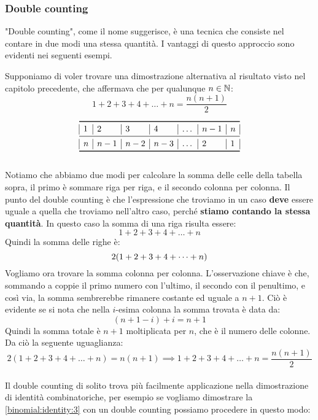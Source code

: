 \documentclass[11pt]{scrartcl}
\begin{document}
	\subsubsection{Double counting}
	"Double counting", come il nome suggerisce, è una tecnica che consiste nel contare in due modi una stessa quantità. I vantaggi di questo approccio sono evidenti nei seguenti esempi.
	
	\begin{example}
		Supponiamo di voler trovare una dimostrazione alternativa al risultato visto nel capitolo precedente, che affermava che per qualunque $n\in\mathbb N$:
		$$1+2+3+4+\dots+n=\frac{n(n+1)}{2}$$
	\end{example}
	\[
	\begin{array}{|l|l|l|l|l|l|l|}
		\toprule
		1 & 2 & 3 & 4 & \dots & n-1 & n\\
		\midrule
		n & n-1 & n-2 & n-3 & \dots & 2 & 1 \\
		\bottomrule
	\end{array}
	\]
	\\
	Notiamo che abbiamo due modi per calcolare la somma delle celle della tabella sopra, il primo è sommare riga per riga, e il secondo colonna per colonna. Il punto del double counting è che l'espressione che troviamo in un caso \textbf{deve} essere uguale a quella che troviamo nell'altro caso, perché \textbf{stiamo contando la stessa quantità}. In questo caso la somma di una riga risulta essere:
	$$1+2+3+4+\dots+n$$
	Quindi la somma delle righe è:
	\begin{equation}\notag
		\label{double:1}
		2(1+2+3+4+\dots+n)
	\end{equation}
	Vogliamo ora trovare la somma colonna per colonna. L'osservazione chiave è che, sommando a coppie il primo numero con l'ultimo, il secondo con il penultimo, e così via, la somma sembrerebbe rimanere costante ed uguale a $n+1$.
	Ciò è evidente se si nota che nella $i$-esima colonna la somma trovata è data da:
	$$(n+1-i)+i=n+1$$
	Quindi la somma totale è $n+1$ moltiplicata per $n$, che è il numero delle colonne.
	Da ciò la seguente uguaglianza:$$2(1+2+3+4+\dots+n)=n(n+1) \implies
	1+2+3+4+\dots+n=\frac{n(n+1)}{2}$$ 
	\\
	Il double counting di solito trova più facilmente applicazione nella dimostrazione di identità combinatoriche, per esempio se vogliamo dimostrare la \ref{binomial:identity:3} con un double counting possiamo procedere in questo modo:
\end{document}
